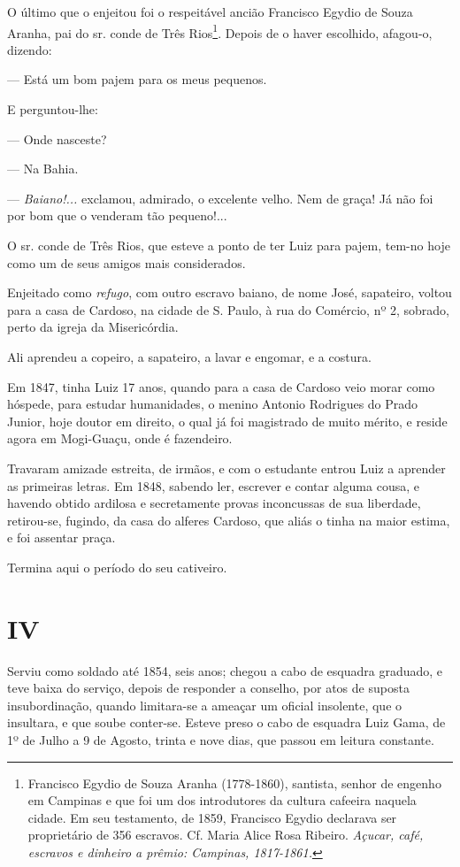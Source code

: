 O último que o enjeitou foi o respeitável ancião Francisco Egydio de
Souza Aranha, pai do sr. conde de Três Rios\footnote{Francisco Egydio
  de Souza Aranha (1778-1860), santista, senhor de engenho em Campinas e
  que foi um dos introdutores da cultura cafeeira naquela cidade. Em seu
  testamento, de 1859, Francisco Egydio declarava ser proprietário de
  356 escravos. Cf. Maria Alice Rosa Ribeiro. \emph{Açucar, café,
  escravos e dinheiro a prêmio: Campinas, 1817-1861.}}. Depois de o
haver escolhido, afagou-o, dizendo:

--- Está um bom pajem para os meus pequenos.

E perguntou-lhe:

--- Onde nasceste?

--- Na Bahia.

--- \emph{Baiano!...} exclamou, admirado, o excelente velho. Nem de
graça! Já não foi por bom que o venderam tão pequeno!...

O sr. conde de Três Rios, que esteve a ponto de ter Luiz para pajem,
tem-no hoje como um de seus amigos mais considerados.

Enjeitado como \emph{refugo}, com outro escravo baiano, de nome José,
sapateiro, voltou para a casa de Cardoso, na cidade de S. Paulo, à rua
do Comércio, nº 2, sobrado, perto da igreja da Misericórdia.

Ali aprendeu a copeiro, a sapateiro, a lavar e engomar, e a costura.

Em 1847, tinha Luiz 17 anos, quando para a casa de Cardoso veio morar
como hóspede, para estudar humanidades, o menino Antonio Rodrigues do
Prado Junior, hoje doutor em direito, o qual já foi magistrado de muito
mérito, e reside agora em Mogi-Guaçu, onde é fazendeiro.

Travaram amizade estreita, de irmãos, e com o estudante entrou Luiz a
aprender as primeiras letras. Em 1848, sabendo ler, escrever e contar
alguma cousa, e havendo obtido ardilosa e secretamente provas
inconcussas de sua liberdade, retirou-se, fugindo, da casa do alferes
Cardoso, que aliás o tinha na maior estima, e foi assentar praça.

Termina aqui o período do seu cativeiro.

\section*{IV}

Serviu como soldado até 1854, seis anos; chegou a cabo de esquadra
graduado, e teve baixa do serviço, depois de responder a conselho, por
atos de suposta insubordinação, quando limitara-se a ameaçar um oficial
insolente, que o insultara, e que soube conter-se. Esteve preso o cabo
de esquadra Luiz Gama, de 1º de Julho a 9 de Agosto, trinta e nove dias,
que passou em leitura constante.

